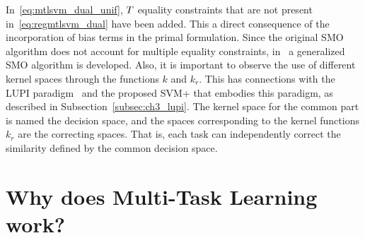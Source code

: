 In~\eqref{eq:mtlsvm_dual_unif}, $T$ equality constraints that are not present in~\eqref{eq:regmtlsvm_dual} have been added. This a direct consequence of the incorporation of bias terms in the primal formulation. Since the original SMO algorithm does not account for multiple equality constraints, in~\cite{CaiC12} a generalized SMO algorithm is developed.
Also, it is important to observe the use of different kernel spaces through the functions $k$ and $k_r$.
This has connections with the LUPI paradigm~\cite{VapnikI15a} and the proposed SVM+ that embodies this paradigm, as described in Subsection~\ref{subsec:ch3_lupi}. The kernel space for the common part is named the decision space, and the spaces corresponding to the kernel functions $k_r$ are the correcting spaces. That is, each task can independently correct the similarity defined by the common decision space.








\section{Why does Multi-Task Learning work?}
% 
